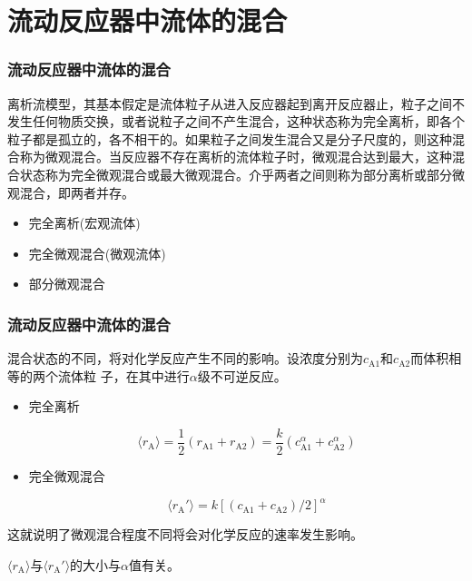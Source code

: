 \section{流动反应器中流体的混合}


\begin{frame}
    \frametitle{流动反应器中流体的混合}

    离析流模型，其基本假定是流体粒子从进入反应器起到离开反应器止，粒子之间不发生任何物质交换，或者说粒子之间不产生混合，这种状态称为完全离析，即各个粒子都是孤立的，各不相干的。如果粒子之间发生混合又是分子尺度的，则这种混合称为微观混合。当反应器不存在离析的流体粒子时，微观混合达到最大，这种混合状态称为完全微观混合或最大微观混合。介乎两者之间则称为部分离析或部分微观混合，即两者并存。
    \begin{itemize}
        \item 完全离析(宏观流体)    
        \item 完全微观混合(微观流体)
        \item 部分微观混合
    \end{itemize}

\end{frame}


\begin{frame}
    \frametitle{流动反应器中流体的混合}

    混合状态的不同，将对化学反应产生不同的影响。设浓度分别为$c_\mathrm{A1}$和$c_\mathrm{A2}$而体积相等的两个流体粒
子，在其中进行$\alpha$级不可逆反应。
    \begin{itemize}
        \item 完全离析
        
        \[
            \langle r_\mathrm{A}\rangle  = \frac{1}{2}(r_\mathrm{A1} + r_\mathrm{A2}) = \frac{k}{2}(c_\mathrm{A1}^{\alpha} + c_\mathrm{A2}^{\alpha})
        \]
        \item 完全微观混合
        
        \[
            \langle r_\mathrm{A}' \rangle  = k[(c_\mathrm{A1} + c_\mathrm{A2})/2]^{\alpha}
        \]
    \end{itemize}
    这就说明了微观混合程度不同将会对化学反应的速率发生影响。
    
    $\langle r_\mathrm{A}\rangle$与$\langle r_\mathrm{A}' \rangle$的大小与$\alpha$值有关。

\end{frame}



